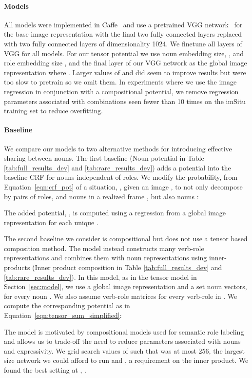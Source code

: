 \documentclass[10pt,twocolumn,letterpaper]{article}
\begin{document}
\paragraph{Models}
All models were implemented in Caffe~\cite{caffe} and use a pretrained VGG network~\cite{vgg} for the base image representation with the final two fully connected layers replaced with two fully connected layers of dimensionality 1024. We finetune all layers of VGG for all models.
For our tensor potential we use noun embedding size, , and role embedding size , and the final layer of our VGG network as the global image representation where . Larger values of  and  did seem to improve results but were too slow to pretrain so we omit them.
In experiments where we use the image regression in conjunction with a compositional potential, we remove regression parameters associated with combinations seen fewer than 10 times on the imSitu training set to reduce overfitting.

\paragraph{Baseline}
We compare our models to two alternative methods for introducing effective sharing between nouns.
The first baseline (Noun potential in Table \ref{tab:full_results_dev} and \ref{tab:rare_results_dev}) adds a potential into the baseline CRF for nouns independent of roles.
We modify the probability, from Equation~\ref{eqn:crf_pot} of a situation, , given an image , to not only decompose by pairs of roles,  and nouns  in a realized frame , but also nouns :   

The added potential, , is computed using a regression from a global image representation for each unique .  

The second baseline we consider is compositional but does not use a tensor based composition method.
The model instead constructs many verb-role representations and combines them with noun representations using inner-products (Inner product composition in Table \ref{tab:full_results_dev} and \ref{tab:rare_results_dev}). 
In this model, as in the tensor model in Section~\ref{sec:model}, we use a global image representation  and a set noun vectors,  for every noun .  
We also assume  verb-role matrices  for every verb-role in .
We compute the corresponding potential as in Equation~\ref{eqn:tensor_sum_simplified}:

The model is motivated by compositional models used for semantic role labeling~\cite{fitz_srl} and allows us to trade-off the need to reduce parameters associated with nouns and expressivity. 
We grid search values of  such that  was at most 256, the largest size network we could afford to run and , a requirement on the inner product. We found the best setting at , . 
\end{document}
